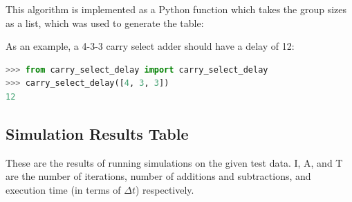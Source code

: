 \documentclass[12pt]{article}
\begin{document}
This algorithm is implemented as a Python function which takes
the group sizes as a list, which was used to generate the table:



As an example, a 4-3-3 carry select adder should have a delay of 12:

\begin{lstlisting}[language=python]
>>> from carry_select_delay import carry_select_delay
>>> carry_select_delay([4, 3, 3])
12
\end{lstlisting}

\begin{landscape}
    \section{Simulation Results Table}
    \label{app:results-table}

    These are the results of running simulations on the given test data. I, A,
    and T are the number of iterations, number of additions and subtractions,
    and execution time (in terms of $\Delta t$) respectively.


\end{landscape}
\end{document}
